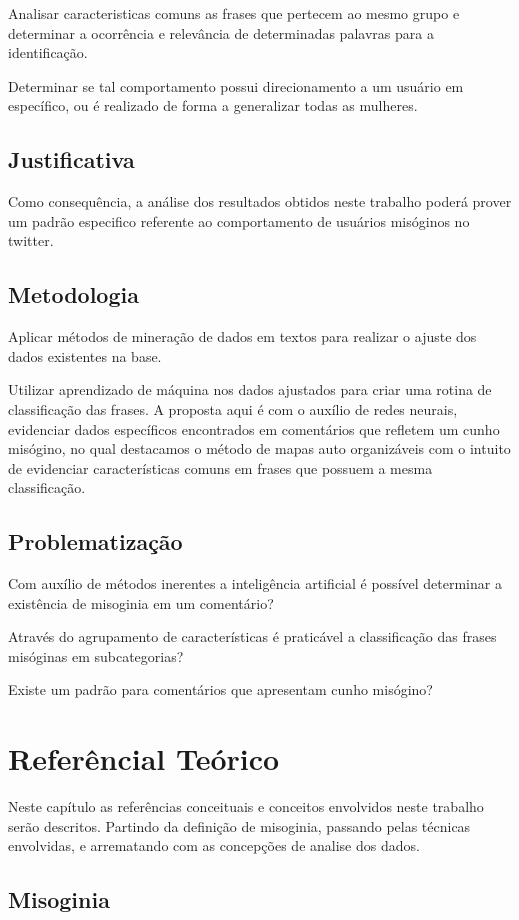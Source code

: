\documentclass[
	12pt,				%
	openright,			%
	twoside,			%
	a4paper,			%
	english,			%
	french,				%
	spanish,			%
	brazil				%
	]{abntex2}
\begin{document}
Analisar caracteristicas comuns as frases que pertecem ao mesmo grupo e determinar a ocorrência e relevância de determinadas palavras para a identificação.

Determinar se tal comportamento possui direcionamento a um usuário em específico, ou é realizado de forma a generalizar todas as mulheres.

\section{Justificativa}
Como consequência, a análise dos resultados obtidos neste trabalho poderá prover um padrão especifico referente ao comportamento de usuários misóginos no twitter.

\section{Metodologia}
Aplicar métodos de mineração de dados em textos para realizar o ajuste dos dados existentes na base. 

Utilizar aprendizado de máquina nos dados ajustados para criar uma rotina de classificação das frases.
A proposta aqui é com o auxílio de redes neurais, evidenciar dados específicos encontrados em comentários que refletem um cunho misógino, no qual destacamos o método de mapas auto organizáveis com o intuito de evidenciar características comuns em frases que possuem a mesma classificação.


\section{Problematização}
Com auxílio de métodos inerentes a inteligência artificial é possível determinar a existência de misoginia em um comentário?

Através do agrupamento de características é praticável a classificação das frases misóginas em subcategorias?

Existe um padrão para comentários que apresentam cunho misógino? 
\chapter{Referêncial Teórico}
Neste capítulo as referências conceituais e  conceitos envolvidos neste trabalho serão descritos. Partindo da definição de misoginia, passando pelas técnicas envolvidas, e arrematando com as concepções de analise dos dados.

\section{Misoginia}
\end{document}
